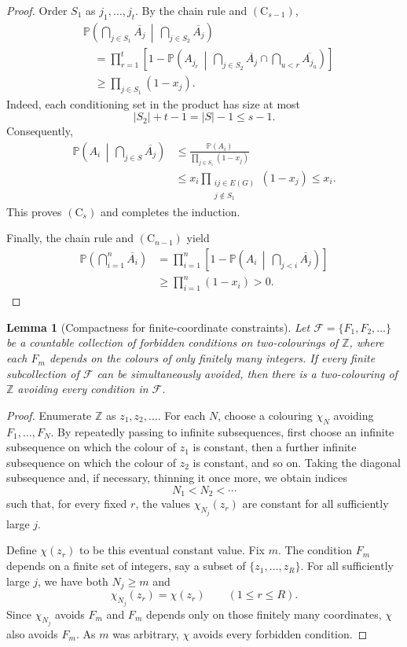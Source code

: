 \documentclass[11pt]{article}
\newtheorem{lemma}[theorem]{Lemma}
\theoremstyle{definition}
\theoremstyle{remark}
\newcommand{\Z}{\mathbb Z}
\newcommand{\col}{\chi}
\begin{document}
\begin{proof}
Order $S_1$ as $j_1,\ldots,j_t$. By the chain rule and $(\mathrm C_{s-1})$,
\begin{align*}
&\mathbb P\left(\bigcap_{j\in S_1}\overline{A_j}\,\middle|\,
\bigcap_{j\in S_2}\overline{A_j}\right)\\
&\quad=
\prod_{r=1}^t
\left[
1-
\mathbb P\left(
A_{j_r}\,\middle|\,
\bigcap_{j\in S_2}\overline{A_j}
\cap
\bigcap_{u<r}\overline{A_{j_u}}
\right)
\right]\\
&\quad\ge\prod_{j\in S_1}(1-x_j).
\end{align*}
Indeed, each conditioning set in the product has size at most
\[
|S_2|+t-1=|S|-1\le s-1.
\]
Consequently,
\begin{align*}
\mathbb P\left(A_i\,\middle|\,\bigcap_{j\in S}\overline{A_j}\right)
&\le
\frac{\mathbb P(A_i)}{\prod_{j\in S_1}(1-x_j)}\\
&\le x_i\prod_{\substack{ij\in E(G)\\j\notin S_1}}(1-x_j)
\le x_i.
\end{align*}
This proves $(\mathrm C_s)$ and completes the induction.

Finally, the chain rule and $(\mathrm C_{n-1})$ yield
\begin{align*}
\mathbb P\left(\bigcap_{i=1}^n\overline{A_i}\right)
&=\prod_{i=1}^n
\left[
1-\mathbb P\left(A_i\,\middle|\,
\bigcap_{j<i}\overline{A_j}\right)
\right]\\
&\ge\prod_{i=1}^n(1-x_i)>0.
\end{align*}
\end{proof}

\begin{lemma}[Compactness for finite-coordinate constraints]\label{lem:compactness}
Let $\mathcal F=\{F_1,F_2,\ldots\}$ be a countable collection of forbidden conditions on two-colourings of $\Z$, where each $F_m$ depends on the colours of only finitely many integers. If every finite subcollection of $\mathcal F$ can be simultaneously avoided, then there is a two-colouring of $\Z$ avoiding every condition in $\mathcal F$.
\end{lemma}

\begin{proof}
Enumerate $\Z$ as $z_1,z_2,\ldots$. For each $N$, choose a colouring $\col_N$ avoiding $F_1,\ldots,F_N$. By repeatedly passing to infinite subsequences, first choose an infinite subsequence on which the colour of $z_1$ is constant, then a further infinite subsequence on which the colour of $z_2$ is constant, and so on. Taking the diagonal subsequence and, if necessary, thinning it once more, we obtain indices
\[
N_1<N_2<\cdots
\]
such that, for every fixed $r$, the values $\col_{N_j}(z_r)$ are constant for all sufficiently large $j$.

Define $\col(z_r)$ to be this eventual constant value. Fix $m$. The condition $F_m$ depends on a finite set of integers, say a subset of $\{z_1,\ldots,z_R\}$. For all sufficiently large $j$, we have both $N_j\ge m$ and
\[
\col_{N_j}(z_r)=\col(z_r)\qquad(1\le r\le R).
\]
Since $\col_{N_j}$ avoids $F_m$ and $F_m$ depends only on those finitely many coordinates, $\col$ also avoids $F_m$. As $m$ was arbitrary, $\col$ avoids every forbidden condition.
\end{proof}
\end{document}
